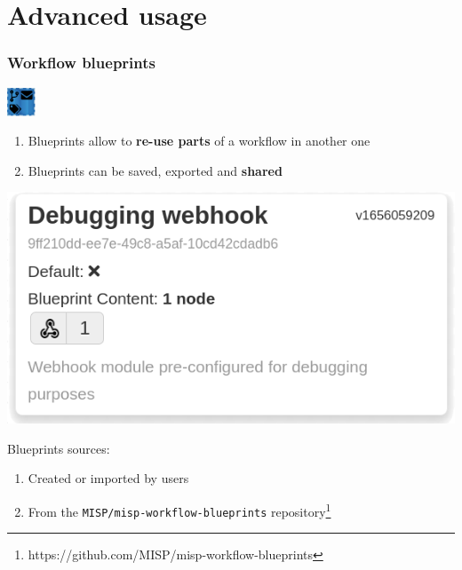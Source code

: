 \section{Advanced usage}
\begin{frame}
    \frametitle{Workflow blueprints}
    \hspace*{0.9\textwidth}\includegraphics[width=32px]{pictures/blueprint-32.png}
    \vspace*{-2em}
    \begin{enumerate}
        \item Blueprints allow to \textbf{re-use parts} of a workflow in another one
        \item Blueprints can be saved, exported and \textbf{shared}
    \end{enumerate}
    \begin{center}
        \includegraphics[width=0.5\linewidth]{pictures/blueprint-debugging.png}
    \end{center}
    Blueprints sources:
    \begin{enumerate}
        \item Created or imported by users
        \item From the \texttt{MISP/misp-workflow-blueprints} repository\footnote{\scriptsize https://github.com/MISP/misp-workflow-blueprints}
    \end{enumerate}
\end{frame}

